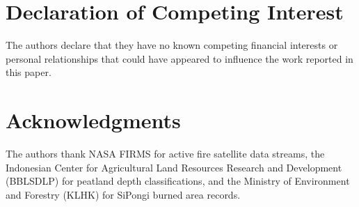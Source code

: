 \documentclass[11pt,a4paper]{article}
\begin{document}
\section*{Declaration of Competing Interest}
The authors declare that they have no known competing financial interests or personal relationships that could have appeared to influence the work reported in this paper.

\section*{Acknowledgments}
The authors thank NASA FIRMS for active fire satellite data streams, the Indonesian Center for Agricultural Land Resources Research and Development (BBLSDLP) for peatland depth classifications, and the Ministry of Environment and Forestry (KLHK) for SiPongi burned area records.

\small


\end{document}
